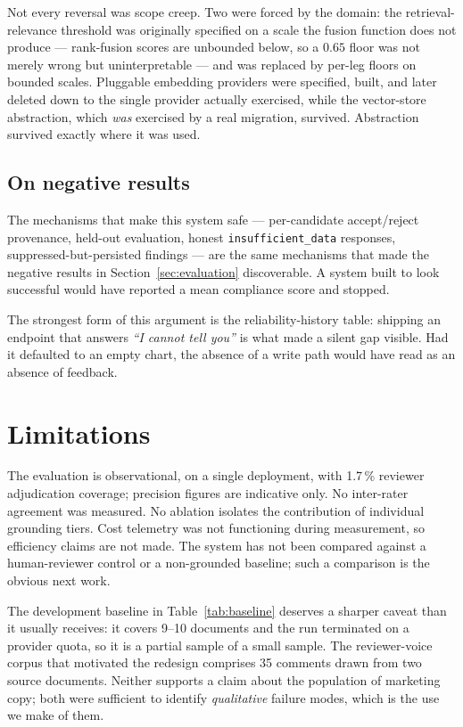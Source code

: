 \documentclass[10pt]{article}
\newcommand{\code}[1]{\texttt{\small #1}}
\begin{document}
Not every reversal was scope creep. Two were forced by the domain: the
retrieval-relevance threshold was originally specified on a scale the fusion
function does not produce --- rank-fusion scores are unbounded below, so a
$0.65$ floor was not merely wrong but uninterpretable --- and was replaced by
per-leg floors on bounded scales. Pluggable embedding providers were specified,
built, and later deleted down to the single provider actually exercised, while
the vector-store abstraction, which \emph{was} exercised by a real migration,
survived. Abstraction survived exactly where it was used.

\subsection{On negative results}

The mechanisms that make this system safe --- per-candidate accept/reject
provenance, held-out evaluation, honest \code{insufficient\_data} responses,
suppressed-but-persisted findings --- are the same mechanisms that made the
negative results in Section~\ref{sec:evaluation} discoverable. A system built to
look successful would have reported a mean compliance score and stopped.

The strongest form of this argument is the reliability-history table: shipping
an endpoint that answers \emph{``I cannot tell you''} is what made a silent gap
visible. Had it defaulted to an empty chart, the absence of a write path would
have read as an absence of feedback.

\section{Limitations}

The evaluation is observational, on a single deployment, with 1.7\,\% reviewer
adjudication coverage; precision figures are indicative only. No inter-rater
agreement was measured. No ablation isolates the contribution of individual
grounding tiers. Cost telemetry was not functioning during measurement, so
efficiency claims are not made. The system has not been compared against a
human-reviewer control or a non-grounded baseline; such a comparison is the
obvious next work.

The development baseline in Table~\ref{tab:baseline} deserves a sharper
caveat than it usually receives: it covers 9--10 documents and the run
terminated on a provider quota, so it is a partial sample of a small sample.
The reviewer-voice corpus that motivated the redesign comprises 35 comments
drawn from two source documents. Neither supports a claim about the population
of marketing copy; both were sufficient to identify \emph{qualitative} failure
modes, which is the use we make of them.
\end{document}
